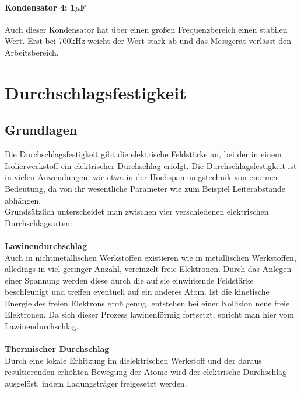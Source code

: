 \documentclass[a4paper,twoside,12pt,DIV=13,BCOR=5mm,numbers=noenddot,cleardoublepage=empty]{scrbook}
\begin{document}
    \subsubsection{Kondensator 4: 1$\mu$F }
    Auch dieser Kondensator hat \"uber einen gro\ss{}en Frequenzbereich einen stabilen Wert. Erst bei 700kHz weicht 
    der Wert stark ab und das Messger\"at verl\"asst den Arbeitsbereich.
    \chapter{Durchschlagsfestigkeit}
    \section{Grundlagen}
		Die Durchschlagsfestigkeit gibt die elektrische Feldst\"arke an, bei der in einem Isolierwerkstoff ein elektrischer Durchschlag 	
		erfolgt.
		Die Durchschlagsfestigkeit ist in vielen Anwendungen, wie etwa in der Hochspannungstechnik von enormer Bedeutung, da von ihr 		
		wesentliche Parameter wie zum Beispiel Leiterabst\"ande abh\"angen.
		\\
		Grunds\"atzlich unterscheidet man zwischen vier verschiedenen elektrischen Durchschlagsarten:
		\\
		\\
		\textbf{Lawinendurchschlag}
			\\
			Auch in nichtmetallischen Werkstoffen existieren wie in metallischen 
			Werkstoffen, alledings in viel geringer Anzahl,  vereinzelt freie Elektronen.
			Durch das Anlegen einer Spannung werden diese durch die auf sie einwirkende Feldst\"arke 
			beschleunigt und treffen eventuell auf ein anderes Atom.
			Ist die kinetische Energie des freien Elektrons gro\ss{} genug,
			entstehen bei einer Kollision neue freie Elektronen.
			Da sich dieser Prozess lawinenf\"ormig fortsetzt, spricht man hier vom Lawinendurchschlag.
			\\
			\\
		\textbf{Thermischer Durchschlag}
			\\
			Durch eine lokale Erhitzung im dielektrischen Werkstoff und der daraus resultierenden erh\"ohten Bewegung der Atome wird der
			elektrische Durchschlag ausgel\"ost, indem Ladungstr\"ager 
			freigesetzt werden.
			\\
			\\
\end{document}
